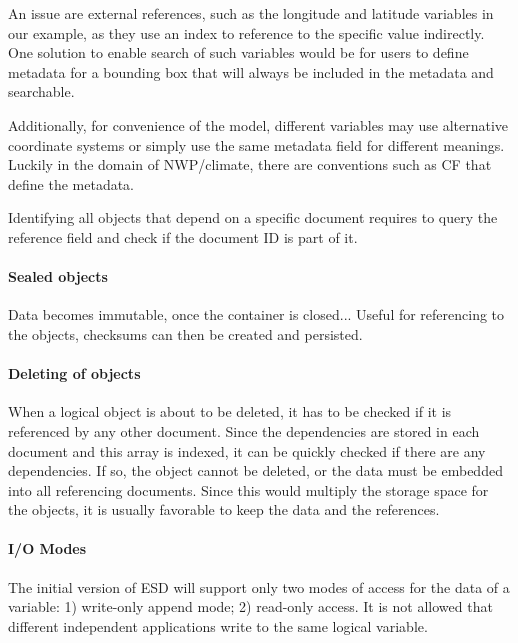 \documentclass{../../template/esiwace-report}
\begin{document}
An issue are external references, such as the longitude and latitude variables in our example, as they use an index to reference to the specific value indirectly.
One solution to enable search of such variables would be for users to define metadata for a bounding box that will always be included in the metadata and searchable.

Additionally, for convenience of the model, different variables may use alternative coordinate systems or simply use the same metadata field for different meanings.
Luckily in the domain of NWP/climate, there are conventions such as CF that define the metadata.

Identifying all objects that depend on a specific document requires to query the reference field and check if the document ID is part of it.




\paragraph{Sealed objects}
Data becomes immutable, once the container is closed...
Useful for referencing to the objects, checksums can then be created and persisted.



\paragraph{Deleting of objects}
When a logical object is about to be deleted, it has to be checked if it is referenced by any other document.
Since the dependencies are stored in each document and this array is indexed, it can be quickly checked if there are any dependencies.
If so, the object cannot be deleted, or the data must be embedded into all referencing documents.
Since this would multiply the storage space for the objects, it is usually favorable to keep the data and the references.

\paragraph{I/O Modes}

The initial version of ESD will support only two modes of access for the data of a variable:
1) write-only append mode; 2) read-only access.
It is not allowed that different independent applications write to the same logical variable.
\end{document}
